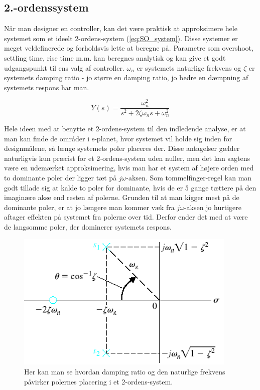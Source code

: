 \subsection{2.-ordenssystem}

Når man designer en controller, kan det være praktisk at approksimere hele systemet som et ideelt 2-ordens-system (\ref{eq:SO_system}). Disse systemer er meget veldefinerede og forholdsvis lette at beregne på. Parametre som overshoot, settling time, rise time m.m. kan beregnes analytisk og kan give et godt udgangspunkt til ens valg af controller. $\omega_{n}$ er systemets naturlige frekvens og $\zeta$ er systemets damping ratio - jo større en damping ratio, jo bedre en dæmpning af systemets respons har man.

\begin{equation}\label{eq:SO_system}
Y(s)=\frac{\omega_{n}^2}{s^2+2\zeta\omega_{n}s+\omega_{n}^2}
\end{equation}

Hele ideen med at benytte et 2-ordens-system til den indledende analyse, er at man kan finde de områder i s-planet, hvor systemet vil holde sig inden for designmålene, så længe systemets poler placeres der. Disse antagelser gælder naturligvis kun præcist for et 2-ordens-system uden nuller, men det kan sagtens være en udemærket approksimering, hvis man har et system af højere orden med to dominante poler der ligger tæt på $j\omega$-aksen. Som tommelfinger-regel kan man godt tillade sig at kalde to poler for dominante, hvis de er 5 gange tættere på den imaginære akse end resten af polerne. Grunden til at man kigger mest på de dominante poler, er at jo længere man kommer væk fra $j\omega$-aksen jo hurtigere aftager effekten på systemet fra polerne over tid. Derfor ender det med at være de langsomme poler, der dominerer systemets respons.

\begin{figure}[!ht]
	\centering
	\includegraphics[scale=0.5]{Billeder/Damping_Ratio.PNG}
	\caption{Her kan man se hvordan damping ratio og den naturlige frekvens påvirker polernes placering i et 2-ordens-system.}
	\label{fig:SO_system}
\end{figure}

